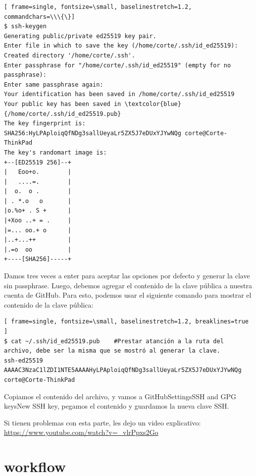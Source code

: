 \documentclass{apuntes_itsv}
\begin{document}
\begin{Verbatim}[ frame=single, fontsize=\small, baselinestretch=1.2,  commandchars=\\\{\}]
$ ssh-keygen
Generating public/private ed25519 key pair.
Enter file in which to save the key (/home/corte/.ssh/id_ed25519): 
Created directory '/home/corte/.ssh'.
Enter passphrase for "/home/corte/.ssh/id_ed25519" (empty for no passphrase): 
Enter same passphrase again: 
Your identification has been saved in /home/corte/.ssh/id_ed25519
Your public key has been saved in \textcolor{blue}{/home/corte/.ssh/id_ed25519.pub}
The key fingerprint is:
SHA256:HyLPAploiqQfNDg3sallUeyaLr5ZX5J7eDUxYJYwNQg corte@Corte-ThinkPad
The key's randomart image is:
+--[ED25519 256]--+
|   Eoo+o.        |
|   ....=.        |
|  o.  o .        |
| . *.o   o       |
|o.%o+ . S +      |
|+Xoo ..+ = .     |
|=... oo.+ o      |
|..+...++         |
|.=o  oo          |
+----[SHA256]-----+
\end{Verbatim}

Damos tres veces a enter para aceptar las opciones por defecto y generar la clave sin passphrase.
Luego, debemos agregar el contenido de la clave pública a nuestra cuenta de GitHub.
Para esto, podemos usar el siguiente comando para mostrar el contenido de la clave pública:
\begin{Verbatim}[ frame=single, fontsize=\small, baselinestretch=1.2, breaklines=true ]
$ cat ~/.ssh/id_ed25519.pub    #Prestar atanción a la ruta del archivo, debe ser la misma que se mostró al generar la clave.
ssh-ed25519 AAAAC3NzaC1lZDI1NTE5AAAAHyLPAploiqQfNDg3sallUeyaLr5ZX5J7eDUxYJYwNQg corte@Corte-ThinkPad
\end{Verbatim}

Copiamos el contenido del archivo, y vamos a GitHub\textrightarrow Settings\textrightarrow SSH and GPG keys\textrightarrow New SSH key,
pegamos el contenido y guardamos la nueva clave SSH.

Si tienen problemas con esta parte, les dejo un video explicativo: \url{https://www.youtube.com/watch?v=_vlrPpxs2Go}


\section{workflow}

\end{document}
